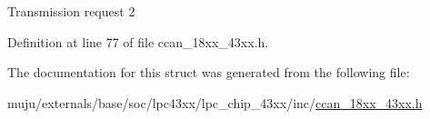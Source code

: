Transmission request 2 

Definition at line 77 of file ccan\+\_\+18xx\+\_\+43xx.\+h.



The documentation for this struct was generated from the following file\+:\begin{DoxyCompactItemize}
\item 
muju/externals/base/soc/lpc43xx/lpc\+\_\+chip\+\_\+43xx/inc/\hyperlink{ccan__18xx__43xx_8h}{ccan\+\_\+18xx\+\_\+43xx.\+h}\end{DoxyCompactItemize}
